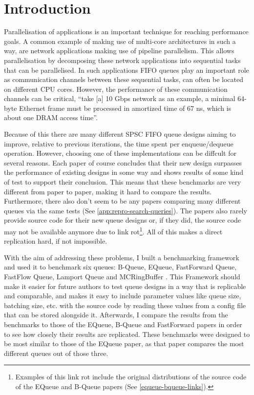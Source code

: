 \section{Introduction}
\label{sec:introduction}
Parallelisation of applications is an important technique for reaching performance goals.
A common example of making use of multi-core architectures in such a way, are network applications making use of pipeline parallelism\cite{Upadhyaya2007,WangCheng2009}.
This allows parallelisation by decomposing these network applications into sequential tasks that can be parallelised\cite{WangCheng2009}.
In such applications FIFO queues play an important role as communication channels between these sequential tasks, can often be located on different CPU cores.
However, the performance of these communication channels can be critical, ``take [a] 10 Gbps network as an example, a minimal 64-byte Ethernet frame must be processed in amortized time of 67 ns, which is about one DRAM access time''\cite{B-Queue}.

Because of this there are many different SPSC FIFO queue designs aiming to improve, relative to previous iterations, the time spent per enqueue/dequeue operation\cite{B-Queue,EQueue,FastForward,FastFlowGithub,MCRingBuffer}.
However, choosing one of these implementations can be diffcult for several reasons.
Each paper of course concludes that their new design surpasses the performance of existing designs in some way and shows results of some kind of test to support their conclusion.
This means that these benchmarks are very different from paper to paper, making it hard to compare the results.
Furthermore, there also don't seem to be any papers comparing many different queues via the same tests (See \autoref{app:repro-search-queries}).
The papers also rarely provide source code for their new queue designs or, if they did, the source code may not be available anymore
due to link rot\footnote{Examples of this link rot include the original distributions of the source code of the EQueue and B-Queue papers (See \autoref{equeue-bqueue-links}).}.
All of this makes a direct replication hard, if not impossible\cite{sep-scientific-reproducibility}.

With the aim of addressing these problems, I built a benchmarking framework and used it to benchmark six queues: B-Queue, EQueue, FastForward Queue, FastFlow Queue, Lamport Queue and MCRingBuffer \cite{B-Queue,EQueue,FastForward,FastFlowGithub,Lamport,MCRingBuffer}.
This Framework should make it easier for future authors to test queue designs in a way that is replicable and comparable, and makes it easy to include parameter values like queue size, batching size, etc. with the source code by reading these values from a config file that can be stored alongside it.
Afterwards, I compare the results from the benchmarks to those of the EQueue, B-Queue and FastForward papers in order to see how closely their results are replicated.
These benchmarks were designed to be most similar to those of the EQueue paper, as that paper compares the most different queues out of those three.

